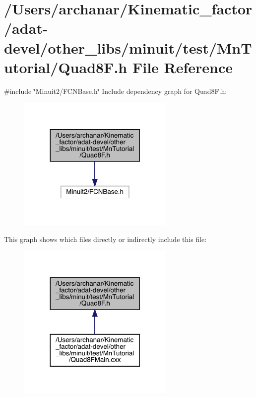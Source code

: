 \hypertarget{adat-devel_2other__libs_2minuit_2test_2MnTutorial_2Quad8F_8h}{}\section{/\+Users/archanar/\+Kinematic\+\_\+factor/adat-\/devel/other\+\_\+libs/minuit/test/\+Mn\+Tutorial/\+Quad8F.h File Reference}
\label{adat-devel_2other__libs_2minuit_2test_2MnTutorial_2Quad8F_8h}
{\ttfamily \#include \char`\"{}Minuit2/\+F\+C\+N\+Base.\+h\char`\"{}}\newline
Include dependency graph for Quad8\+F.\+h\+:
\nopagebreak
\begin{figure}[H]
\begin{center}
\leavevmode
\includegraphics[width=215pt]{df/d96/adat-devel_2other__libs_2minuit_2test_2MnTutorial_2Quad8F_8h__incl}
\end{center}
\end{figure}
This graph shows which files directly or indirectly include this file\+:
\nopagebreak
\begin{figure}[H]
\begin{center}
\leavevmode
\includegraphics[width=215pt]{db/d10/adat-devel_2other__libs_2minuit_2test_2MnTutorial_2Quad8F_8h__dep__incl}
\end{center}
\end{figure}
